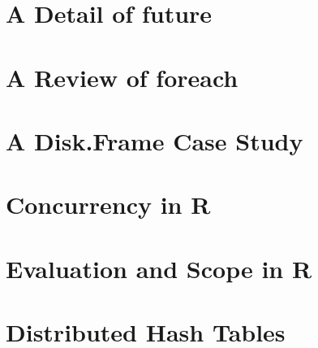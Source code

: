\section{A Detail of future}\label{sec:future-detail}

\section{A Review of foreach}\label{sec:review-foreach}

\section{A Disk.Frame Case Study}\label{sec:disk-frame-study}

\section{Concurrency in R}\label{sec:concurrency}

\section{Evaluation and Scope in R}\label{sec:eval}

\section{Distributed Hash Tables}\label{sec:dht}

